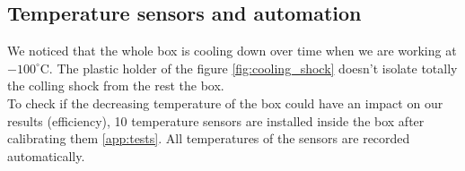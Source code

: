 \documentclass[a4paper, 11pt]{report}%
\begin{document}
  
  \subsection{Temperature sensors and automation}
  
  We noticed that the whole box is cooling down over time when we are working at $-100^{\circ}$C. The plastic holder of the figure
  \ref{fig:cooling_shock} doesn't isolate totally the colling shock from the rest the box.\\
  To check if the decreasing temperature of the box could have an impact on our results (efficiency), 10 temperature sensors are 
  installed inside the box after calibrating them \ref{app:tests}. All temperatures of the sensors are recorded automatically.  
  
  \newpage
  
\end{document}
